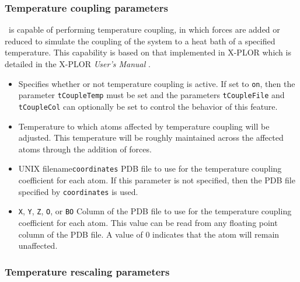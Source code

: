 \subsubsection{Temperature coupling parameters}

\NAMD\ is capable
of performing temperature coupling, in which forces are added or 
reduced to simulate the coupling of the system to a heat bath 
of a specified temperature.  
This capability is based on that implemented in X-PLOR which is detailed
in the X-PLOR {\it User's Manual} .

\begin{itemize}

\item
{}
{Specifies whether or not temperature coupling is active.  
If set to {\tt on}, then the parameter {\tt tCoupleTemp} must be set and 
the parameters {\tt tCoupleFile} and {\tt tCoupleCol} can 
optionally be set to control the behavior of this feature.} 

\item
{}
{Temperature to which atoms affected 
by temperature coupling will be adjusted.  
This temperature will be roughly maintained across the affected atoms 
through the addition of forces.}

\item
{}
{UNIX filename}{{\tt coordinates}}
{PDB file to use for the temperature coupling coefficient for each atom.  
If this parameter is not specified, then 
the PDB file specified by {\tt coordinates} is used.} 

\item
{}
{{\tt X}, {\tt Y}, {\tt Z}, {\tt O}, or {\tt B}}{{\tt O}} 
{Column of the PDB file to use for the temperature coupling coefficient for 
each atom.  This value can be read from any 
floating point column of the PDB file.  
A value of $0$ indicates that the atom will remain unaffected.}

\end{itemize}

\subsubsection{Temperature rescaling parameters}

